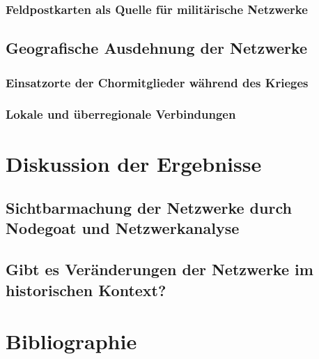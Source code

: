 \documentclass[12pt, a4paper, ngerman, bidi=default]{article}
\begin{document}
\begin{description}
    \subsubsection{Feldpostkarten als Quelle für militärische Netzwerke}
    
 \subsection{ Geografische Ausdehnung der Netzwerke}
  \subsubsection{Einsatzorte der Chormitglieder während des Krieges}
  \subsubsection{ Lokale und überregionale Verbindungen}
  \newpage
\section{Diskussion der Ergebnisse}
  \subsection{Sichtbarmachung der Netzwerke durch Nodegoat und Netzwerkanalyse}
  \subsection{Gibt es Veränderungen der Netzwerke im historischen Kontext?}
  \newpage
\endgroup
\pagecolor{white}
\section{Bibliographie}



\end{description}
\end{document}
